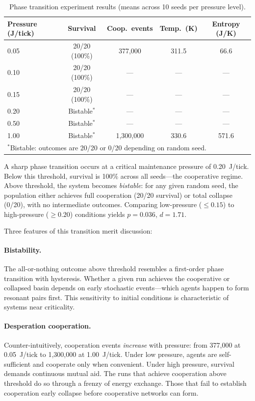 \documentclass[12pt,a4paper]{article}
\begin{document}
\begin{table}[H]
\centering
\caption{Phase transition experiment results (means across 10 seeds per pressure level).}
\label{tab:phase}
\begin{tabular}{@{}lcccc@{}}
\toprule
\textbf{Pressure (J/tick)} & \textbf{Survival} & \textbf{Coop.\ events} & \textbf{Temp.\ (K)} & \textbf{Entropy (J/K)} \\
\midrule
0.05 & 20/20 (100\%) & 377{,}000 & 311.5 & 66.6  \\
0.10 & 20/20 (100\%) & ---       & ---   & ---   \\
0.15 & 20/20 (100\%) & ---       & ---   & ---   \\
0.20 & Bistable$^*$  & ---       & ---   & ---   \\
0.50 & Bistable$^*$  & ---       & ---   & ---   \\
1.00 & Bistable$^*$  & 1{,}300{,}000 & 330.6 & 571.6 \\
\bottomrule
\multicolumn{5}{l}{\small $^*$Bistable: outcomes are 20/20 or 0/20 depending on random seed.}
\end{tabular}
\end{table}

A sharp phase transition occurs at a critical maintenance pressure of 0.20~J/tick. Below this threshold, survival is 100\% across all seeds---the cooperative regime. Above threshold, the system becomes \emph{bistable}: for any given random seed, the population either achieves full cooperation (20/20 survival) or total collapse (0/20), with no intermediate outcomes. Comparing low-pressure ($\leq 0.15$) to high-pressure ($\geq 0.20$) conditions yields $p = 0.036$, $d = 1.71$.

Three features of this transition merit discussion:

\paragraph{Bistability.} The all-or-nothing outcome above threshold resembles a first-order phase transition with hysteresis. Whether a given run achieves the cooperative or collapsed basin depends on early stochastic events---which agents happen to form resonant pairs first. This sensitivity to initial conditions is characteristic of systems near criticality.

\paragraph{Desperation cooperation.} Counter-intuitively, cooperation events \emph{increase} with pressure: from 377{,}000 at 0.05~J/tick to 1{,}300{,}000 at 1.00~J/tick. Under low pressure, agents are self-sufficient and cooperate only when convenient. Under high pressure, survival demands continuous mutual aid. The runs that achieve cooperation above threshold do so through a frenzy of energy exchange. Those that fail to establish cooperation early collapse before cooperative networks can form.
\end{document}
